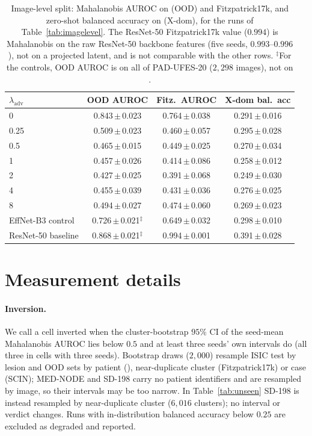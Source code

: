 \documentclass{midl}
\newcommand{\lam}{\lambda_{\mathrm{adv}}}
\newcommand{\xdomHalf}{0.270\,$\pm$\,0.034}
\newcommand{\xdomOne}{0.258\,$\pm$\,0.012}
\newcommand{\xdomFour}{0.276\,$\pm$\,0.025}
\newcommand{\xdomEight}{0.269\,$\pm$\,0.023}
\newcommand{\xdomEffb}{0.298\,$\pm$\,0.010}
\begin{document}
\begin{table}[h]
\centering
\caption{Image-level split: Mahalanobis AUROC on \texttt{} (OOD) and Fitzpatrick17k, and zero-shot balanced
accuracy on \texttt{} (X-dom), for the runs of Table~\ref{tab:imagelevel}. The ResNet-50 Fitzpatrick17k value ($0.994$)
is Mahalanobis on the raw ResNet-50 backbone features (five seeds, $0.993$--$0.996$), not on a projected latent, and is not comparable with the other rows.
$^\ddagger$For the controls, OOD AUROC is on all of PAD-UFES-20 ($2{,}298$ images), not on \texttt{}.}
\label{tab:imagelevel-b}
\begin{tabular}{lccc}
\toprule
$\lam$ & OOD AUROC & Fitz.\ AUROC & X-dom bal.\ acc \\
\midrule
0 & 0.843\,$\pm$\,0.023 & 0.764\,$\pm$\,0.038 & 0.291\,$\pm$\,0.016 \\
0.25 & 0.509\,$\pm$\,0.023 & 0.460\,$\pm$\,0.057 & 0.295\,$\pm$\,0.028 \\
0.5 & 0.465\,$\pm$\,0.015 & 0.449\,$\pm$\,0.025 & \xdomHalf \\
1 & 0.457\,$\pm$\,0.026 & 0.414\,$\pm$\,0.086 & \xdomOne \\
2 & 0.427\,$\pm$\,0.025 & 0.391\,$\pm$\,0.068 & 0.249\,$\pm$\,0.030 \\
4 & 0.455\,$\pm$\,0.039 & 0.431\,$\pm$\,0.036 & \xdomFour \\
8 & 0.494\,$\pm$\,0.027 & 0.474\,$\pm$\,0.060 & \xdomEight \\
\midrule
EffNet-B3 control & 0.726\,$\pm$\,0.021$^\ddagger$ & 0.649\,$\pm$\,0.032 & \xdomEffb \\
ResNet-50 baseline & 0.868\,$\pm$\,0.021$^\ddagger$ & 0.994\,$\pm$\,0.001 & 0.391\,$\pm$\,0.028 \\
\bottomrule
\end{tabular}
\end{table}


\FloatBarrier
\section{Measurement details}
\label{app:measure}

\paragraph{Inversion.} We call a cell inverted when the cluster-bootstrap $95\%$ CI of the
seed-mean Mahalanobis AUROC lies below $0.5$ and at least three seeds' own intervals do
(all three in cells with three seeds). Bootstrap draws ($2{,}000$) resample ISIC test by lesion and OOD sets by
patient (\texttt{}), near-duplicate cluster (Fitzpatrick17k) or case (SCIN);
MED-NODE and SD-198 carry no patient identifiers and are resampled by image, so their
intervals may be too narrow. In Table~\ref{tab:unseen} SD-198 is instead resampled by near-duplicate
cluster ($6{,}016$ clusters); no interval or verdict changes. Runs with in-distribution
balanced accuracy below $0.25$ are excluded as degraded and reported.
\end{document}
